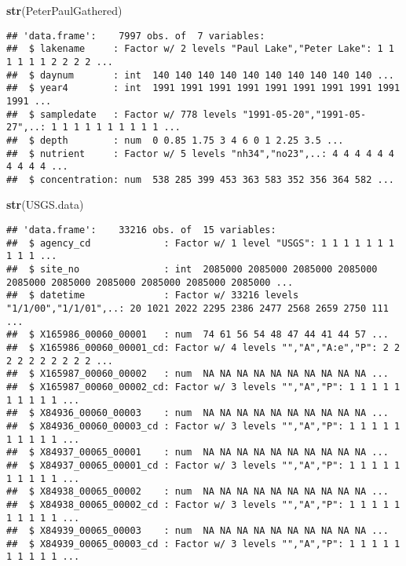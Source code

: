 \documentclass[]{article}
\newenvironment{Shaded}{\begin{snugshade}}{\end{snugshade}}
\newcommand{\KeywordTok}[1]{\textcolor[rgb]{0.13,0.29,0.53}{\textbf{#1}}}
\newcommand{\NormalTok}[1]{#1}
\begin{document}
\begin{Shaded}
\begin{Highlighting}[]
\KeywordTok{str}\NormalTok{(PeterPaulGathered)}
\end{Highlighting}
\end{Shaded}

\begin{verbatim}
## 'data.frame':    7997 obs. of  7 variables:
##  $ lakename     : Factor w/ 2 levels "Paul Lake","Peter Lake": 1 1 1 1 1 1 2 2 2 2 ...
##  $ daynum       : int  140 140 140 140 140 140 140 140 140 140 ...
##  $ year4        : int  1991 1991 1991 1991 1991 1991 1991 1991 1991 1991 ...
##  $ sampledate   : Factor w/ 778 levels "1991-05-20","1991-05-27",..: 1 1 1 1 1 1 1 1 1 1 ...
##  $ depth        : num  0 0.85 1.75 3 4 6 0 1 2.25 3.5 ...
##  $ nutrient     : Factor w/ 5 levels "nh34","no23",..: 4 4 4 4 4 4 4 4 4 4 ...
##  $ concentration: num  538 285 399 453 363 583 352 356 364 582 ...
\end{verbatim}

\begin{Shaded}
\begin{Highlighting}[]
\KeywordTok{str}\NormalTok{(USGS.data) }
\end{Highlighting}
\end{Shaded}

\begin{verbatim}
## 'data.frame':    33216 obs. of  15 variables:
##  $ agency_cd             : Factor w/ 1 level "USGS": 1 1 1 1 1 1 1 1 1 1 ...
##  $ site_no               : int  2085000 2085000 2085000 2085000 2085000 2085000 2085000 2085000 2085000 2085000 ...
##  $ datetime              : Factor w/ 33216 levels "1/1/00","1/1/01",..: 20 1021 2022 2295 2386 2477 2568 2659 2750 111 ...
##  $ X165986_00060_00001   : num  74 61 56 54 48 47 44 41 44 57 ...
##  $ X165986_00060_00001_cd: Factor w/ 4 levels "","A","A:e","P": 2 2 2 2 2 2 2 2 2 2 ...
##  $ X165987_00060_00002   : num  NA NA NA NA NA NA NA NA NA NA ...
##  $ X165987_00060_00002_cd: Factor w/ 3 levels "","A","P": 1 1 1 1 1 1 1 1 1 1 ...
##  $ X84936_00060_00003    : num  NA NA NA NA NA NA NA NA NA NA ...
##  $ X84936_00060_00003_cd : Factor w/ 3 levels "","A","P": 1 1 1 1 1 1 1 1 1 1 ...
##  $ X84937_00065_00001    : num  NA NA NA NA NA NA NA NA NA NA ...
##  $ X84937_00065_00001_cd : Factor w/ 3 levels "","A","P": 1 1 1 1 1 1 1 1 1 1 ...
##  $ X84938_00065_00002    : num  NA NA NA NA NA NA NA NA NA NA ...
##  $ X84938_00065_00002_cd : Factor w/ 3 levels "","A","P": 1 1 1 1 1 1 1 1 1 1 ...
##  $ X84939_00065_00003    : num  NA NA NA NA NA NA NA NA NA NA ...
##  $ X84939_00065_00003_cd : Factor w/ 3 levels "","A","P": 1 1 1 1 1 1 1 1 1 1 ...
\end{verbatim}
\end{document}
